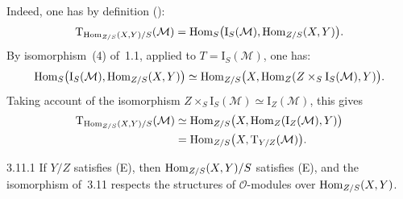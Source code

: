 Indeed, one has by definition ():
\[
\mathrm{T}_{\operatorname{Hom}_{Z/S}(X,Y)/S}(\mathcal{M})
=\operatorname{Hom}_{S}\bigl(\mathrm{I}_{S}(\mathcal{M}),\operatorname{Hom}_{Z/S}(X,Y)\bigr).
\]
By isomorphism~(4) of~1.1, applied to \(T=\mathrm{I}_{S}(\mathcal{M})\),
one has:
\[
\operatorname{Hom}_{S}\bigl(\mathrm{I}_{S}(\mathcal{M}),\operatorname{Hom}_{Z/S}(X,Y)\bigr)
\simeq
\operatorname{Hom}_{Z/S}\bigl(X,\operatorname{Hom}_{Z}(Z\times_{S}\mathrm{I}_{S}(\mathcal{M}),Y)\bigr).
\]
Taking account of the isomorphism
\(Z\times_{S}\mathrm{I}_{S}(\mathcal{M})\simeq\mathrm{I}_{Z}(\mathcal{M})\),
this gives
\begin{align*}
\mathrm{T}_{\operatorname{Hom}_{Z/S}(X,Y)/S}(\mathcal{M})
&\simeq
\operatorname{Hom}_{Z/S}\bigl(X,\operatorname{Hom}_{Z}(\mathrm{I}_{Z}(\mathcal{M}),Y)\bigr)\\
&=\operatorname{Hom}_{Z/S}\bigl(X,\mathrm{T}_{Y/Z}(\mathcal{M})\bigr).
\end{align*}

\begin{corollary}{3.11.1}\label{II.3.11.1}
If \(Y/Z\) satisfies \textup{(E)}, then \(\operatorname{Hom}_{Z/S}(X,Y)/S\) satisfies
\textup{(E)}, and the isomorphism of~3.11 respects the structures of
\(\mathcal{O}\)-modules over \(\operatorname{Hom}_{Z/S}(X,Y)\).%
{\renewcommand{\thefootnote}{(36)}}
\end{corollary}

